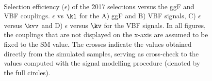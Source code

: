 \begin{figure}[htbp!]
\captionsetup[subfigure]{justification=centering}
\centering
{}
\\
\caption[Selection efficiency ($\epsilon$) of the 2016 selections versus the ggF and VBF couplings]{Selection efficiency ($\epsilon$) of the 2017 selections versus the ggF and VBF couplings. $\epsilon$ vs $\kl$ for the A) ggF and B) VBF signals, C) $\epsilon$ versus $\kvv$ and D) $\epsilon$ versus $\kv$ for the VBF signals. In all figures, the couplings that are not displayed on the x-axis are assumed to be fixed to the SM value. The crosses indicate the values obtained directly from the simulated samples, serving as cross-check to the values computed with the signal modelling procedure (denoted by the full circles).}
\label{fig:eff_sel_ggf_vbf_2017}
\end{figure}

